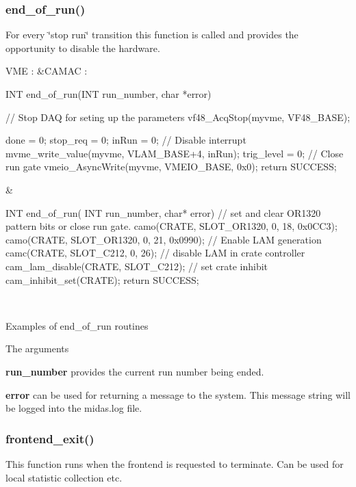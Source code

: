\par
 \hypertarget{FE_sequence_FE_end_of_run}{}\subsubsection{end\_\-of\_\-run()}\label{FE_sequence_FE_end_of_run}
For every \char`\"{}stop run\char`\"{} transition this function is called and provides the opportunity to disable the hardware. \begin{table}[h]\begin{TabularC}{2}
\hline
VME :  &CAMAC :  \\

\begin{DoxyCode}
INT end_of_run(INT run_number, char *error)
{
  // Stop DAQ for seting up the parameters
  vf48_AcqStop(myvme, VF48_BASE);

  done = 0;
  stop_req = 0;
  inRun = 0;
  // Disable interrupt
  mvme_write_value(myvme, VLAM_BASE+4, inRun);
  trig_level = 0;
  // Close run gate
  vmeio_AsyncWrite(myvme, VMEIO_BASE, 0x0);
  return SUCCESS;
}
\end{DoxyCode}
 &
\begin{DoxyCode}
INT end_of_run( INT run_number, char* error)
{
   // set and clear OR1320 pattern bits or close run gate.
   camo(CRATE, SLOT_OR1320, 0, 18, 0x0CC3);
   camo(CRATE, SLOT_OR1320, 0, 21, 0x0990);
   // Enable LAM generation
   camc(CRATE, SLOT_C212, 0, 26);  
   // disable LAM in crate controller
   cam_lam_disable(CRATE, SLOT_C212);
   // set crate inhibit 
   cam_inhibit_set(CRATE);          
   return SUCCESS;
}
\end{DoxyCode}
 \\
\end{TabularC}
\centering
\caption{Examples of end\_\-of\_\-run routines }
\end{table}
The arguments
\begin{DoxyItemize}
\item {\bfseries run\_\-number} provides the current run number being ended.
\item {\bfseries error} can be used for returning a message to the system. This message string will be logged into the midas.log file. \par

\end{DoxyItemize}

\par
 \hypertarget{FE_sequence_FE_frontend_exit}{}\subsubsection{frontend\_\-exit()}\label{FE_sequence_FE_frontend_exit}
This function runs when the frontend is requested to terminate. Can be used for local statistic collection etc.

